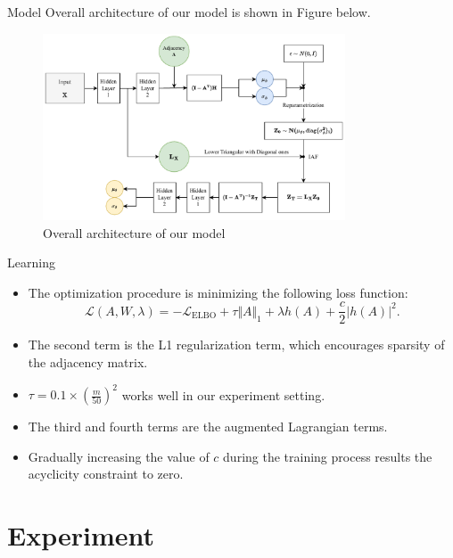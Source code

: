 \documentclass{beamer}
\begin{document}
\begin{frame}{Model}
    Overall architecture of our model is shown in Figure below.
    \begin{figure}
        \centering
        \includegraphics[width=0.8\textwidth]{fig/model.pdf}
        \caption{Overall architecture of our model}
        \label{fig:architecture}
    \end{figure}
\end{frame}

\begin{frame}{Learning}
    \begin{itemize}
        \item The optimization procedure is minimizing the following loss function:
        \begin{equation*}
            \mathcal{L}(A, W, \lambda) =-\mathcal{L}_{\mathrm{ELBO}} + \tau \Vert A \Vert_1 + \lambda h(A) + \frac{c}{2} |h(A)|^2.
        \end{equation*}
        \item The second term is the L1 regularization term, which encourages sparsity of the adjacency matrix.
        \item $\tau=0.1 \times (\frac{m}{50})^2$ works well in our experiment setting.
        \item The third and fourth terms are the augmented Lagrangian terms.
        \item Gradually increasing the value of $c$ during the training process results the acyclicity constraint to zero.
    \end{itemize}
\end{frame}
            

\section{Experiment}
\end{document}
